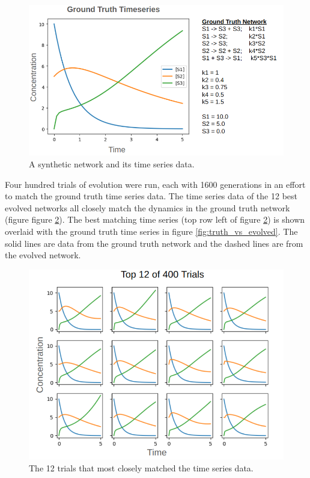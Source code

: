 \documentclass[12pt]{report}
\begin{document}
\begin{figure}
\centering
    \includegraphics[width=18cm]{images/groundtruth.png}
    \caption[A ground truth synthetic network and its time series]{A synthetic network and its time series data.}
    \label{fig:groundtruth}
\end{figure}

Four hundred trials of evolution were run, each with 1600 generations in an effort to match the ground truth time series data. The time series data of the 12 best evolved networks all closely match the dynamics in the ground truth network (figure figure \ref{fig:12_timeseries}). The best matching time series (top row left of figure \ref{fig:12_timeseries}) is shown overlaid with the ground truth time series in figure \ref{fig:truth_vs_evolved}. The solid lines are data from the ground truth network and the dashed lines are from the evolved network.

\begin{figure}
\centering
    \includegraphics[width=15cm]{images/12_timeseries.png}
    \caption[The 12 trials that most closely matched the time series data]{The 12 trials that most closely matched the time series data.}
    \label{fig:12_timeseries}
\end{figure}
\end{document}
